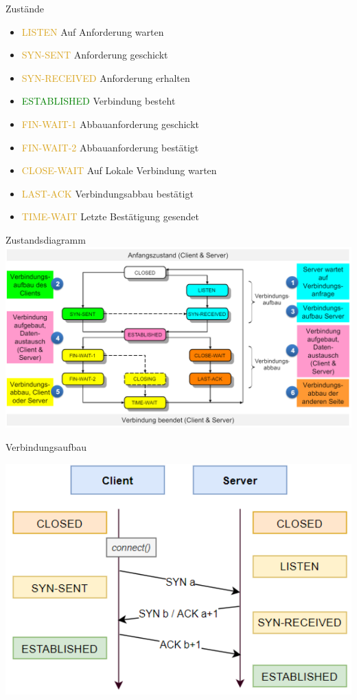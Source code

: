 \begin{definition}{Zustände}
    \begin{itemize}
        \item \textcolor{Goldenrod}{LISTEN} Auf Anforderung warten
        \item \textcolor{Goldenrod}{SYN-SENT} Anforderung geschickt
        \item \textcolor{Goldenrod}{SYN-RECEIVED} Anforderung erhalten
        \item \textcolor{green}{ESTABLISHED} Verbindung besteht
        \item \textcolor{Goldenrod}{FIN-WAIT-1} Abbauanforderung geschickt
        \item \textcolor{Goldenrod}{FIN-WAIT-2} Abbauanforderung bestätigt
        \item \textcolor{Goldenrod}{CLOSE-WAIT} Auf Lokale Verbindung warten
        \item \textcolor{Goldenrod}{LAST-ACK} Verbindungsabbau bestätigt
        \item \textcolor{Goldenrod}{TIME-WAIT} Letzte Bestätigung gesendet
    \end{itemize}
\end{definition}

\begin{concept}{Zustandsdiagramm}\\
    \includegraphics[width=1\linewidth]{images/zustandsdiagramm_tcp.png}
\end{concept}

\begin{KR}{Verbindungsaufbau}
    \begin{center}
        \includegraphics[width=0.7\linewidth]{images/verbindungsaufbau.png}
    \end{center}
\end{KR}

